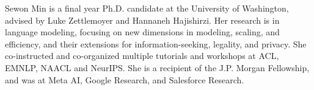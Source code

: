 Sewon Min is a final year Ph.D. candidate at the University of Washington, advised by Luke Zettlemoyer and Hannaneh Hajishirzi. Her research is in language modeling, focusing on new dimensions in modeling, scaling, and efficiency, and their extensions for information-seeking, legality, and privacy. She co-instructed and co-organized multiple tutorials and workshops at ACL, EMNLP, NAACL and NeurIPS. She is a recipient of the J.P. Morgan Fellowship, and was at Meta AI, Google Research, and Salesforce Research.